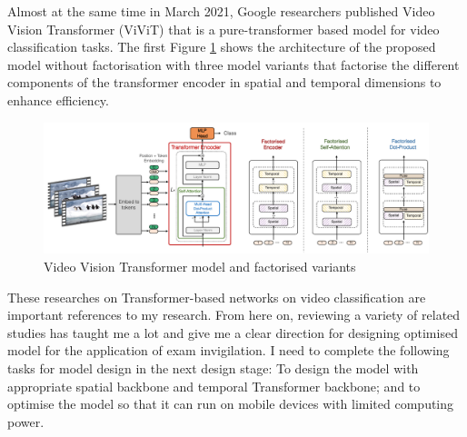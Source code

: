 Almost at the same time in March 2021, Google researchers \citet{arnab2021vivit} published Video Vision Transformer (ViViT) that is a pure-transformer based model for video classification tasks.
The first 
Figure \ref{fig:ext-vivit} shows the architecture of the proposed model without factorisation with three model variants that factorise the different components of the transformer encoder in spatial and temporal dimensions to enhance efficiency.

\begin{figure}[!ht]
    \centering
    \includegraphics[width=\textwidth]{literature/imgs/ext-vivit.pdf}
    \caption{Video Vision Transformer model and factorised variants \cite{arnab2021vivit}}
    \label{fig:ext-vivit}
\end{figure}

These researches on Transformer-based networks on video classification are important references to my research.
From here on, reviewing a variety of related studies has taught me a lot and give me a clear direction for designing optimised model for the application of exam invigilation.
I need to complete the following tasks for model design in the next design stage: To design the model with appropriate spatial backbone and temporal Transformer backbone; and to optimise the model so that it can run on mobile devices with limited computing power.
